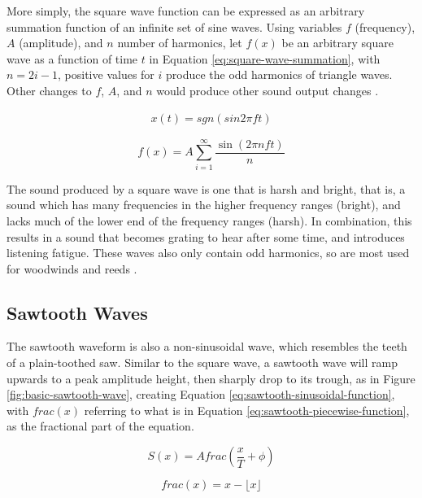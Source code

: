 More simply, the square wave function can be expressed as an arbitrary summation function of an infinite set of sine waves. Using variables $f$ (frequency), $A$ (amplitude), and $n$ number of harmonics, let $f(x)$ be an arbitrary square wave as a function of time $t$ in Equation \ref{eq:square-wave-summation}, with $n = 2i - 1$, positive values for $i$ produce the odd harmonics of triangle waves. Other changes to $f$, $A$, and $n$ would produce other sound output changes \cite{Wellesley_College_Staff_2021}.

\begin{align}
	x(t) = sgn(sin2\pi ft)
	\label{eq:square-wave-function}
\end{align} 

\begin{equation}
	f(x) = A\sum_{i=1}^{\infty}\frac{\sin(2\pi nft)}{n}
	\label{eq:square-wave-summation}
\end{equation}

The sound produced by a square wave is one that is harsh and bright, that is, a sound which has many frequencies in the higher frequency ranges (bright), and lacks much of the lower end of the frequency ranges (harsh). In combination, this results in a sound that becomes grating to hear after some time, and introduces listening fatigue. These waves also only contain odd harmonics, so are most used for woodwinds and reeds \cite{Dowsett_2016}. 

\subsection{Sawtooth Waves}
The sawtooth waveform is also a non-sinusoidal wave, which resembles the teeth of a plain-toothed saw. Similar to the square wave, a sawtooth wave will ramp upwards to a peak amplitude height, then sharply drop to its trough, as in Figure \ref{fig:basic-sawtooth-wave}, creating Equation \ref{eq:sawtooth-sinusoidal-function}, with $frac(x)$ referring to what is in Equation \ref{eq:sawtooth-piecewise-function}, as the fractional part of the equation. 

\begin{equation}
	S(x) = Afrac(\frac{x}{T} + \phi)
	\label{eq:sawtooth-sinusoidal-function}
\end{equation}

\begin{equation}
	frac(x) = x - \lfloor x \rfloor
	\label{eq:sawtooth-piecewise-function}
\end{equation}

